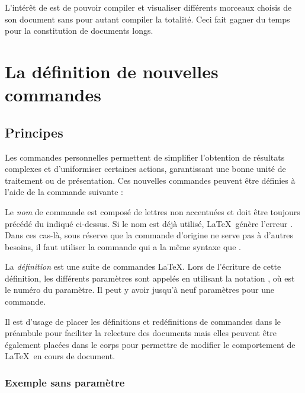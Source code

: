 L'intérêt de  est de pouvoir compiler et visualiser différents morceaux choisis de son document sans pour autant compiler la totalité. Ceci fait gagner du temps pour la constitution de documents longs.





\section{La définition de nouvelles commandes} \label{definition} 

\subsection{Principes}

Les commandes personnelles permettent de simplifier l'obtention de résultats complexes et d'uniformiser certaines actions, garantissant une bonne unité de traitement ou de présentation. Ces nouvelles commandes peuvent être définies à l'aide de la commande suivante :

Le \emph{nom} de commande est composé de lettres non accentuées et doit être toujours précédé du \macro{} indiqué ci-dessus. Si le nom est déjà utilisé, \LaTeX\ génère l'erreur  \fg. Dans ces cas-là, sous réserve que la commande d'origine ne serve pas à d'autres besoins, il faut utiliser la commande  qui a la même syntaxe que . 

La \emph{définition} est une suite de commandes \LaTeX. Lors de l'écriture de cette définition, les différents paramètres sont appelés en utilisant la notation \og {} \fg, où  est le numéro du paramètre. Il peut y avoir jusqu'à neuf paramètres pour une commande.

Il est d'usage de placer les définitions et redéfinitions de commandes dans le préambule pour faciliter la relecture des documents mais elles peuvent être également placées dans le corps pour permettre de modifier le comportement de \LaTeX\ en cours de document.

\subsubsection{Exemple sans paramètre}

